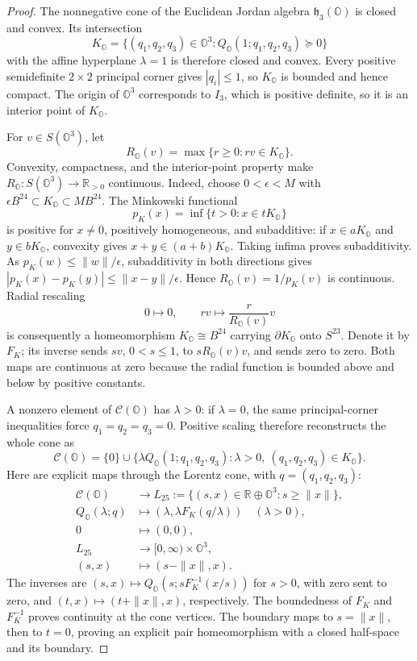 \documentclass[11pt]{article}
\theoremstyle{definition}
\newcommand{\R}{\mathbb R}
\newcommand{\Oo}{\mathbb O}
\begin{document}
\begin{proof}
The nonnegative cone of the Euclidean Jordan algebra
\(\mathfrak h_3(\Oo)\) is closed and convex.  Its intersection
\[
 K_{\Oo}=\{(q_1,q_2,q_3)\in\Oo^3:
              Q_{\Oo}(1;q_1,q_2,q_3)\succeq0\}
\]
with the affine hyperplane \(\lambda=1\) is therefore closed and convex.
Every positive semidefinite \(2\times2\) principal corner gives
\(|q_i|\le1\), so \(K_{\Oo}\) is bounded and hence compact.
The origin of \(\Oo^3\) corresponds to \(I_3\), which is positive
definite, so it is an interior point of \(K_{\Oo}\).

For \(v\in S(\Oo^3)\), let
\[
 R_{\Oo}(v)=\max\{r\ge0:rv\in K_{\Oo}\}.
\]
Convexity, compactness, and the interior-point property make
\(R_{\Oo}:S(\Oo^3)\to\R_{>0}\) continuous.  Indeed, choose
\(0<\epsilon<M\) with
\(\epsilon B^{24}\subset K_{\Oo}\subset M B^{24}\).  The Minkowski
functional
\[
 p_K(x)=\inf\{t>0:x\in tK_{\Oo}\}
\]
is positive for \(x\ne0\), positively homogeneous, and subadditive:
if \(x\in aK_{\Oo}\) and \(y\in bK_{\Oo}\), convexity gives
\(x+y\in(a+b)K_{\Oo}\).  Taking infima proves subadditivity.
As \(p_K(w)\le\|w\|/\epsilon\), subadditivity in both directions gives
\(|p_K(x)-p_K(y)|\le\|x-y\|/\epsilon\).  Hence
\(R_{\Oo}(v)=1/p_K(v)\) is continuous.  Radial rescaling
\[
 0\longmapsto0,\qquad rv\longmapsto
 \frac{r}{R_{\Oo}(v)}v
\]
is consequently a homeomorphism \(K_{\Oo}\cong B^{24}\) carrying
\(\partial K_{\Oo}\) onto \(S^{23}\).  Denote it by \(F_K\); its
inverse sends \(sv\), \(0<s\le1\), to \(sR_{\Oo}(v)v\), and sends
zero to zero.  Both maps are continuous at zero because the radial
function is bounded above and below by positive constants.

A nonzero element of \(\mathcal C(\Oo)\) has \(\lambda>0\): if
\(\lambda=0\), the same principal-corner inequalities force
\(q_1=q_2=q_3=0\).  Positive scaling therefore reconstructs the whole
cone as
\[
 \mathcal C(\Oo)=\{0\}\cup
 \{\lambda Q_{\Oo}(1;q_1,q_2,q_3):
       \lambda>0,\ (q_1,q_2,q_3)\in K_{\Oo}\}.
\]
Here are explicit maps through the Lorentz cone, with
\(q=(q_1,q_2,q_3)\):
\[
 \begin{aligned}
 \mathcal C(\Oo)&\longrightarrow
       L_{25}:=\{(s,x)\in\R\oplus\Oo^3:s\ge\|x\|\},\\
 Q_{\Oo}(\lambda;q)&\longmapsto
       (\lambda,\lambda F_K(q/\lambda))\quad(\lambda>0),\\
 0&\longmapsto(0,0),\\
 L_{25}&\longrightarrow[0,\infty)\times\Oo^3,\\
 (s,x)&\longmapsto(s-\|x\|,x).
 \end{aligned}
\]
The inverses are \((s,x)\mapsto Q_{\Oo}(s;sF_K^{-1}(x/s))\) for
\(s>0\), with zero sent to zero, and
\((t,x)\mapsto(t+\|x\|,x)\), respectively.  The boundedness of
\(F_K\) and \(F_K^{-1}\) proves continuity at the cone vertices.
The boundary maps to \(s=\|x\|\), then to \(t=0\), proving an explicit
pair homeomorphism with a closed half-space and its boundary.


\end{proof}
\end{document}
